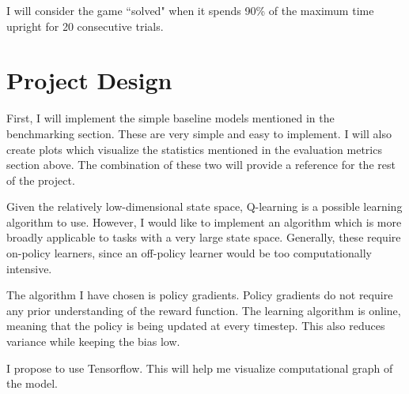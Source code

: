 \documentclass[12pt,a4paper]{article}
\begin{document}
I will consider the game ``solved" when it spends 90\% of the maximum time upright for 20 consecutive trials.


\section*{Project Design}
%
First, I will implement the simple baseline models mentioned in the benchmarking section. These are very simple and easy to implement. I will also create plots which visualize the statistics mentioned in the evaluation metrics section above. The combination of these two will provide a reference for the rest of the project.

Given the relatively low-dimensional state space, Q-learning is a possible learning algorithm to use. However, I would like to implement an algorithm which is more broadly applicable to tasks with a very large state space. Generally, these require on-policy learners, since an off-policy learner would be too computationally intensive.

The algorithm I have chosen is policy gradients. Policy gradients do not require any prior understanding of the reward function.\cite{pg_lecture} The learning algorithm is online, meaning that the policy is being updated at every timestep. This also reduces variance while keeping the bias low.\cite{pg_lecture}


I propose to use Tensorflow. This will help me visualize computational graph of the model.

%
%

\printbibliography
\end{document}
